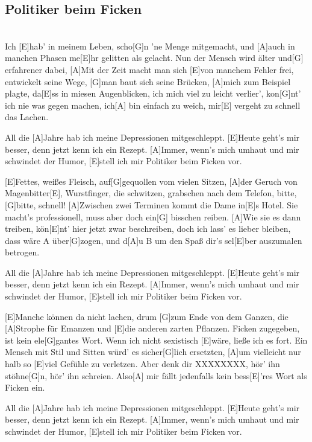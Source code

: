 \subsection{Politiker beim Ficken}

\begin{guitar}
\\
Ich [E]{hab}' in meinem Leben, scho[G]{n 'n}e Menge mitgemacht,
und [A]{au}ch in manchen Phasen me[E]{hr }gelitten als gelacht.
Nun der Mensch wird älter und[G]{ }erfahrener dabei,
[A]{Mit} der Zeit macht man sich [E]{von} manchem Fehler frei,
entwickelt seine Wege, [G]{man} baut sich seine Brücken,
[A]{mi}ch zum Beispiel plagte, da[E]{ss }in miesen Augenblicken,
ich mich viel zu leicht verlier', kon[G]{nt}' ich nie was gegen machen,
ich[A]{ b}in einfach zu weich, mir[E]{ v}ergeht zu schnell das Lachen.


All die [A]{Jah}re hab ich meine Depressionen mitgeschleppt.
[E]{H}eute geht's mir besser, denn jetzt kenn ich ein Rezept.
[A]{I}mmer, wenn's mich umhaut und mir schwindet der Humor,
[E]{st}ell ich mir Politiker beim Ficken vor.
	
[E]{Fet}tes, weißes Fleisch, auf[G]{ge}quollen vom vielen Sitzen,
[A]{der} Geruch von Magenbitter[E]{, }Wurstfinger, die schwitzen,
grabschen nach dem Telefon, bitte, [G]{bit}te, schnell!
[A]{Z}wischen zwei Terminen kommt die Dame in[E]{s }Hotel.
Sie macht's professionell, muss aber doch ein[G]{ b}isschen reiben.
[A]{W}ie sie es dann treiben, kön[E]{nt'} hier jetzt zwar beschreiben,
doch ich lass' es lieber bleiben, dass wäre A über[G]{zo}gen,
und d[A]{u B} um den Spaß dir's sel[E]{ber} auszumalen betrogen.

All die [A]{Jah}re hab ich meine Depressionen mitgeschleppt.
[E]{H}eute geht's mir besser, denn jetzt kenn ich ein Rezept.
[A]{I}mmer, wenn's mich umhaut und mir schwindet der Humor,
[E]{st}ell ich mir Politiker beim Ficken vor.

[E]{M}anche können da nicht lachen, drum [G]{z}um Ende von dem Ganzen,
die [A]{Str}ophe für Emanzen und [E]{di}e anderen zarten Pflanzen.
Ficken zugegeben, ist kein ele[G]{gan}tes Wort.
Wenn ich nicht sexistisch [E]{wäre}, ließe ich es fort.
Ein Mensch mit Stil und Sitten würd' es sicher[G]{lich} ersetzten,
[A]{um} vielleicht nur halb so [E]{viel} Gefühle zu verletzen.
Aber denk dir XXXXXXXX, hör' ihn stöhne[G]{n}, hör' ihn schreien.
Also[A]{ m}ir fällt jedenfalls kein bess[E]{'re}s Wort als Ficken ein.

All die [A]{Jah}re hab ich meine Depressionen mitgeschleppt.
[E]{H}eute geht's mir besser, denn jetzt kenn ich ein Rezept.
[A]{I}mmer, wenn's mich umhaut und mir schwindet der Humor,
[E]{st}ell ich mir Politiker beim Ficken vor.
\end{guitar}